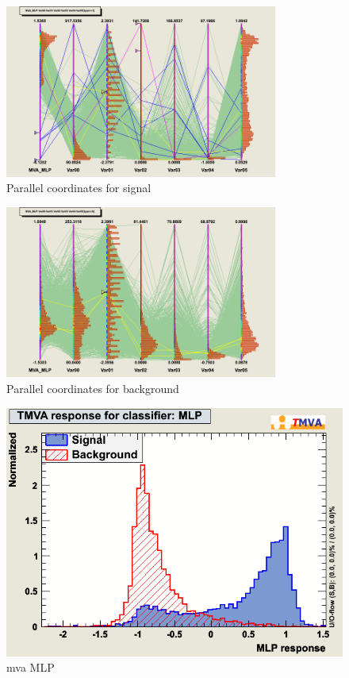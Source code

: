 \begin{figure}[!h]
\begin{center}
\includegraphics[width=0.8\textwidth]{images/ahParacoor_c0_S.png}
\caption{Parallel coordinates for signal}
\label{fig:ahParacoor_c0_S}
\end{center}
\end{figure}
\begin{figure}[!h]
\begin{center}
\includegraphics[width=0.8\textwidth]{images/ahParacoor_c0_B.png}
\caption{Parallel coordinates for background}
\label{fig:ahParacoor_c0_B}
\end{center}
\end{figure}

\clearpage

\begin{figure}[h]
\begin{center}
\includegraphics[width=1.0\textwidth]{images/ahMva_MLP.png}
\caption{mva MLP}
\label{fig:mvamlp}
\end{center}
\end{figure}


